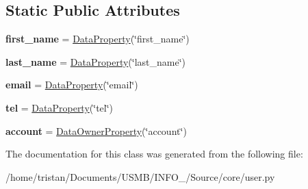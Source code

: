 \subsection*{Static Public Attributes}
\begin{DoxyCompactItemize}
\item 
\mbox{\label{classSource_1_1core_1_1user_1_1User_ae23311526311d408a918a64678ca72c7}} 
{\bfseries first\+\_\+name} = \mbox{\hyperlink{classSource_1_1core_1_1dataproperty_1_1DataProperty}{Data\+Property}}(\char`\"{}first\+\_\+name\char`\"{})
\item 
\mbox{\label{classSource_1_1core_1_1user_1_1User_a7470d30ab88ff79473dcf2e4f30f53fb}} 
{\bfseries last\+\_\+name} = \mbox{\hyperlink{classSource_1_1core_1_1dataproperty_1_1DataProperty}{Data\+Property}}(\char`\"{}last\+\_\+name\char`\"{})
\item 
\mbox{\label{classSource_1_1core_1_1user_1_1User_a20c984ac7a399e87b66be01a85300800}} 
{\bfseries email} = \mbox{\hyperlink{classSource_1_1core_1_1dataproperty_1_1DataProperty}{Data\+Property}}(\char`\"{}email\char`\"{})
\item 
\mbox{\label{classSource_1_1core_1_1user_1_1User_a9f8712859863cbcf219de15e7b971211}} 
{\bfseries tel} = \mbox{\hyperlink{classSource_1_1core_1_1dataproperty_1_1DataProperty}{Data\+Property}}(\char`\"{}tel\char`\"{})
\item 
\mbox{\label{classSource_1_1core_1_1user_1_1User_ac1243141eb7e229dbb0da4431ca8c6a2}} 
{\bfseries account} = \mbox{\hyperlink{classSource_1_1core_1_1dataproperty_1_1DataOwnerProperty}{Data\+Owner\+Property}}(\char`\"{}account\char`\"{})
\end{DoxyCompactItemize}


The documentation for this class was generated from the following file\+:\begin{DoxyCompactItemize}
\item 
/home/tristan/\+Documents/\+U\+S\+M\+B/\+I\+N\+F\+O\+\_/\+Source/core/user.\+py\end{DoxyCompactItemize}
